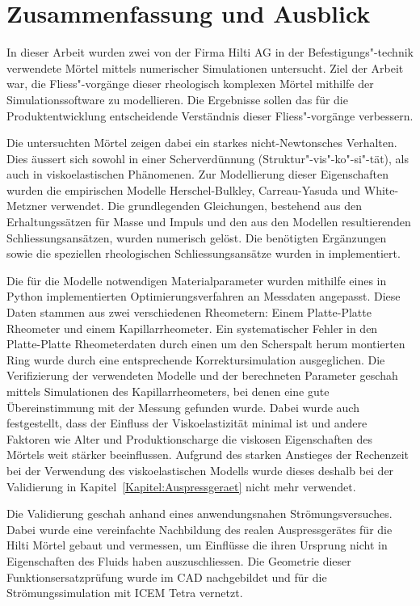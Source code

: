 \section{Zusammenfassung und Ausblick}
\label{Kapitel:Outlook}
In dieser Arbeit wurden zwei von der Firma Hilti AG in der Befestigungs"-technik verwendete Mörtel mittels numerischer Simulationen untersucht.
Ziel der Arbeit war, die Fliess"-vorgänge dieser rheologisch komplexen Mörtel mithilfe der Simulationssoftware \openfoam{} zu modellieren. Die Ergebnisse sollen das für die Produktentwicklung entscheidende Verständnis dieser Fliess"-vorgänge verbessern.

Die untersuchten Mörtel zeigen dabei ein starkes nicht-Newtonsches Verhalten.
Dies äussert sich sowohl in einer Scherverdünnung (Struktur"-vis"-ko"-si"-tät), als auch in viskoelastischen Phänomenen. Zur Modellierung dieser Eigenschaften wurden die empirischen Modelle Herschel-Bulkley, Carreau-Yasuda und White-Metzner verwendet.
Die grundlegenden Gleichungen, bestehend aus den Erhaltungssätzen für Masse und Impuls und den aus den Modellen resultierenden Schliessungsansätzen, wurden numerisch gelöst. Die benötigten Ergänzungen sowie die speziellen rheologischen Schliessungsansätze wurden  in \openfoam{} implementiert.

Die für die Modelle notwendigen Materialparameter wurden mithilfe eines in Python implementierten Optimierungsverfahren an Messdaten angepasst. Diese Daten stammen aus zwei verschiedenen Rheometern: Einem Platte-Platte Rheometer und einem Kapillarrheometer.
Ein systematischer Fehler in den Platte-Platte Rheometerdaten durch einen um den Scherspalt herum montierten Ring wurde durch eine entsprechende Korrektursimulation ausgeglichen.
Die Verifizierung der verwendeten Modelle und der berechneten Parameter geschah mittels Simulationen des Kapillarrheometers, bei denen eine gute Übereinstimmung mit der Messung gefunden wurde.
Dabei wurde auch festgestellt, dass der Einfluss der Viskoelastizität minimal ist und andere Faktoren wie Alter und Produktionscharge die viskosen Eigenschaften des Mörtels weit stärker beeinflussen. Aufgrund des starken Anstieges der Rechenzeit bei der Verwendung des viskoelastischen Modells wurde dieses deshalb bei der Validierung in Kapitel~\ref{Kapitel:Auspressgeraet} nicht mehr verwendet.

Die Validierung geschah anhand eines anwendungsnahen Strömungsversuches. Dabei wurde eine vereinfachte Nachbildung des realen Auspressgerätes für die Hilti Mörtel gebaut und vermessen, um Einflüsse die ihren Ursprung nicht in Eigenschaften des Fluids haben auszuschliessen.
Die Geometrie dieser Funktionsersatzprüfung wurde im CAD nachgebildet und für die Strömungssimulation mit ICEM Tetra vernetzt.

